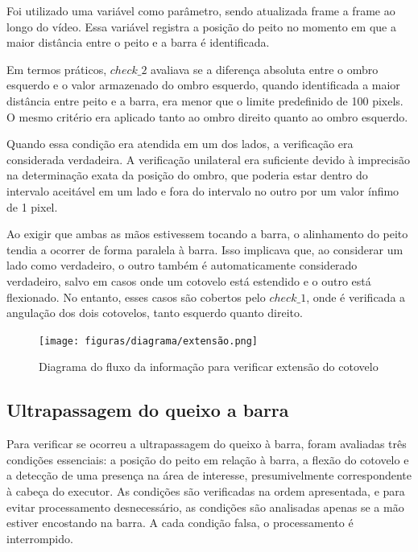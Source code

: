 Foi utilizado uma variável como parâmetro, sendo atualizada frame a frame ao longo do vídeo. Essa variável registra a posição do peito no momento em que a maior distância entre o peito e a barra é identificada.

Em termos práticos, $check\_2$ avaliava se a diferença absoluta entre o ombro esquerdo e o valor armazenado do ombro esquerdo, quando identificada a maior distância entre peito e a barra, era menor que o limite predefinido de 100 pixels. O mesmo critério era aplicado tanto ao ombro direito quanto ao ombro esquerdo.

Quando essa condição era atendida em um dos lados, a verificação era considerada verdadeira. A verificação unilateral era suficiente devido à imprecisão na determinação exata da posição do ombro, que poderia estar dentro do intervalo aceitável em um lado e fora do intervalo no outro por um valor ínfimo de 1 pixel.

Ao exigir que ambas as mãos estivessem tocando a barra, o alinhamento do peito tendia a ocorrer de forma paralela à barra. Isso implicava que, ao considerar um lado como verdadeiro, o outro também é automaticamente considerado verdadeiro, salvo em casos onde um cotovelo está estendido e o outro está flexionado. No entanto, esses casos são cobertos pelo $check\_1$, onde é verificada a angulação dos dois cotovelos, tanto esquerdo quanto direito.


\begin{figure}[H]
	\centering
    \caption{Diagrama do fluxo da informação para verificar extensão do cotovelo}
	\texttt{[image: figuras/diagrama/extensão.png]}
	\label{dia:extensao}
\end{figure}





\subsection[Ultrapassagem do queixo a barra]{Ultrapassagem do queixo a barra}\label{sec:meta}

Para verificar se ocorreu a ultrapassagem do queixo à barra, foram avaliadas três condições essenciais: a posição do peito em relação à barra, a flexão do cotovelo e a detecção de uma presença na área de interesse, presumivelmente correspondente à cabeça do executor. As condições são verificadas na ordem apresentada, e para evitar processamento desnecessário, as condições são analisadas apenas se a mão estiver encostando na barra. A cada condição falsa, o processamento é interrompido.

